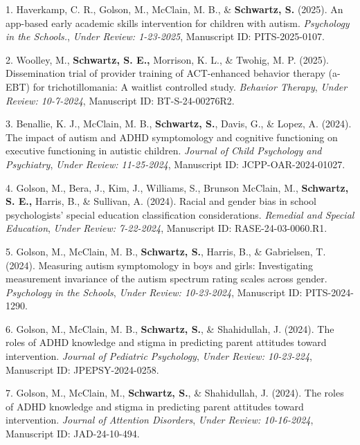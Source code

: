 \documentclass[11pt,a4paper,]{moderncv}
\newlength{\cslhangindent}
\newenvironment{CSLReferences}[2] %
 {\begin{list}{}{%
  \setlength{\itemindent}{0pt}
  \setlength{\leftmargin}{0pt}
  \setlength{\parsep}{0pt}
  \ifodd #1
   \setlength{\leftmargin}{\cslhangindent}
   \setlength{\itemindent}{-1\cslhangindent}
  \fi
  \setlength{\itemsep}{#2\baselineskip}}}
 {\end{list}}
\begin{document}
\begin{CSLReferences}{1}{0}
1. Haverkamp, C. R., Golson, M., McClain, M. B., \&
\textbf{Schwartz, S.} (2025). An app-based early academic skills
intervention for children with autism. \emph{Psychology in the
Schools.}, \emph{Under Review: 1-23-2025}, Manuscript ID:
PITS-2025-0107.

2. Woolley, M., \textbf{Schwartz, S. E.,} Morrison, K. L., \& Twohig, M.
P. (2025). Dissemination trial of provider training of ACT-enhanced
behavior therapy (a-EBT) for trichotillomania: A waitlist controlled
study. \emph{Behavior Therapy}, \emph{Under Review: 10-7-2024},
Manuscript ID: BT-S-24-00276R2.

3. Benallie, K. J., McClain, M. B., \textbf{Schwartz, S.}, Davis, G., \&
Lopez, A. (2024). The impact of autism and ADHD symptomology and
cognitive functioning on executive functioning in autistic children.
\emph{Journal of Child Psychology and Psychiatry}, \emph{Under Review:
11-25-2024}, Manuscript ID: JCPP-OAR-2024-01027.

4. Golson, M., Bera, J., Kim, J., Williams, S., Brunson McClain, M.,
\textbf{Schwartz, S. E.,} Harris, B., \& Sullivan, A. (2024). Racial and
gender bias in school psychologists' special education classification
considerations. \emph{Remedial and Special Education}, \emph{Under
Review: 7-22-2024}, Manuscript ID: RASE-24-03-0060.R1.

5. Golson, M., McClain, M. B., \textbf{Schwartz, S.}, Harris, B., \&
Gabrielsen, T. (2024). Measuring autism symptomology in boys and girls:
Investigating measurement invariance of the autism spectrum rating
scales across gender. \emph{Psychology in the Schools}, \emph{Under
Review: 10-23-2024}, Manuscript ID: PITS-2024-1290.

6. Golson, M., McClain, M. B., \textbf{Schwartz, S.}, \& Shahidullah, J.
(2024). The roles of ADHD knowledge and stigma in predicting parent
attitudes toward intervention. \emph{Journal of Pediatric Psychology},
\emph{Under Review: 10-23-224}, Manuscript ID: JPEPSY-2024-0258.

7. Golson, M., McClain, M., \textbf{Schwartz, S.}, \& Shahidullah, J.
(2024). The roles of ADHD knowledge and stigma in predicting parent
attitudes toward intervention. \emph{Journal of Attention Disorders},
\emph{Under Review: 10-16-2024}, Manuscript ID: JAD-24-10-494.


\end{CSLReferences}
\end{document}
